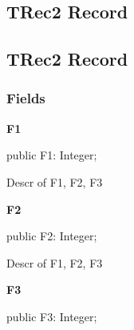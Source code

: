 \documentclass{report}
\newif\ifpdf
\begin{document}
\subsection*{\large{\textbf{TRec2 Record}}\normalsize\hspace{1ex}\hrulefill}
\else
\subsection*{TRec2 Record}
\fi
\label{ok_multiple_fields.TRec2}
\subsubsection*{\large{\textbf{Fields}}\normalsize\hspace{1ex}\hfill}
\begin{list}{}{
\setlength{\itemindent}{0cm}
\setlength{\listparindent}{0cm}
\setlength{\leftmargin}{\evensidemargin}
\addtolength{\leftmargin}{\tmplength}
\settowidth{\labelsep}{X}
\addtolength{\leftmargin}{\labelsep}
\setlength{\labelwidth}{\tmplength}
}
\label{ok_multiple_fields.TRec2-F1}
\item[\textbf{F1}\hfill]
\ifpdf
\begin{flushleft}
\fi
\begin{ttfamily}
public F1: Integer;\end{ttfamily}

\ifpdf
\end{flushleft}
\fi


\par Descr of F1, F2, F3\label{ok_multiple_fields.TRec2-F2}
\item[\textbf{F2}\hfill]
\ifpdf
\begin{flushleft}
\fi
\begin{ttfamily}
public F2: Integer;\end{ttfamily}

\ifpdf
\end{flushleft}
\fi


\par Descr of F1, F2, F3\label{ok_multiple_fields.TRec2-F3}
\item[\textbf{F3}\hfill]
\ifpdf
\begin{flushleft}
\fi
\begin{ttfamily}
public F3: Integer;\end{ttfamily}

\ifpdf
\end{flushleft}
\fi



\end{list}
\end{document}
